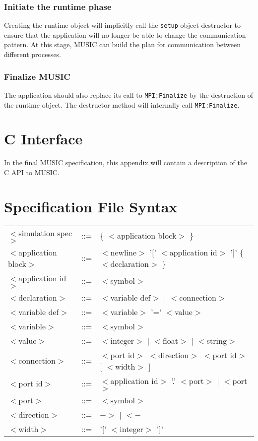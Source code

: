 \documentclass[a4paper]{report}
\begin{document}
\subsection{Initiate the runtime phase}

Creating the runtime object will implicitly call the \lstinline|setup|
object destructor to ensure that the application will no longer be
able to change the communication pattern.  At this stage, MUSIC can
build the plan for communication between different processes.

\subsection{Finalize MUSIC}

The application should also replace its call to
\lstinline|MPI:Finalize| by the destruction of the runtime object.
The destructor method will internally call \lstinline|MPI:Finalize|.




\appendix

\chapter{C Interface}

In the final MUSIC specification, this appendix will contain a
description of the C API to MUSIC.



\chapter{Specification File Syntax}
\label{sec:specsyntax}

\newcommand{\nt}[1]{$<$#1$>$}

\begin{tabular}{lcl}
\nt{simulation spec}   & ::= & \{ \nt{application block} \} \\
\nt{application block} & ::= & \nt{newline} '[' \nt{application id} ']' \{ \nt{declaration}
\} \\
\nt{application id}    & ::= & \nt{symbol} \\
\nt{declaration}       & ::= & \nt{variable def} $|$ \nt{connection} \\
\nt{variable def}      & ::= & \nt{variable} '=' \nt{value} \\
\nt{variable}	       & ::= & \nt{symbol} \\
\nt{value} 	       & ::= & \nt{integer} $|$ \nt{float} $|$ \nt{string} \\
\nt{connection}	       & ::= & \nt{port id} \nt{direction} \nt{port id} [ \nt{width} ] \\
\nt{port id}	       & ::= & \nt{application id} '.' \nt{port} $|$
\nt{port} \\
\nt{port}	       & ::= & \nt{symbol} \\
\nt{direction}	       & ::= & $->$ $|$ $<-$ \\
\nt{width}	       & ::= & '[' \nt{integer} ']' \\
\end{tabular}

\printindex
\end{document}
